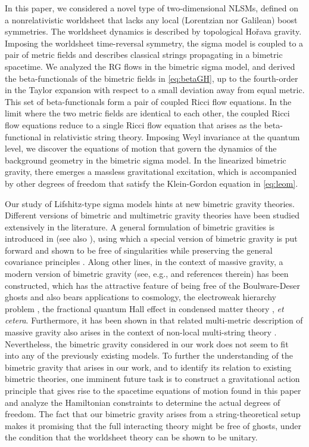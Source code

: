 \documentclass[11pt]{article}
\begin{document}
In this paper, we considered a novel type of two-dimensional NLSMs, defined on a nonrelativistic worldsheet that lacks any local (Lorentzian nor Galilean) boost symmetries. The worldsheet dynamics is described by topological Ho\v{r}ava gravity. Imposing the worldsheet time-reversal symmetry, the sigma model is coupled to a pair of metric fields and describes classical strings propagating in a bimetric spacetime. We analyzed the RG flows in the bimetric sigma model, and derived the beta-functionals of the bimetric fields in \eqref{eq:betaGH}, up to the fourth-order in the Taylor expansion with respect to a small deviation away from equal metric. This set of beta-functionals form a pair of coupled Ricci flow equations. 
In the limit where the two metric fields are identical to each other, the coupled Ricci flow equations reduce to a single Ricci flow equation that arises as the beta-functional in relativistic string theory. Imposing Weyl invariance at the quantum level, we discover the equations of motion that govern the dynamics of the background geometry in the bimetric sigma model. In the linearized bimetric gravity, there emerges a massless gravitational excitation, which is accompanied by other degrees of freedom that satisfy the Klein-Gordon equation in \eqref{eq:leom}. 

Our study of Lifshitz-type sigma models hints at new bimetric gravity theories. Different versions of bimetric and multimetric gravity theories have been studied extensively in the literature. A general formulation of bimetric gravities is introduced in \cite{Rosen:1975kk} (see also \cite{Rosen:1940zza, Rosen:1940zz}), using which a special version of bimetric gravity is put forward and shown to be free of singularities while preserving the general covariance principles \cite{Rosen:1980dp}. Along other lines, in the context of massive gravity, a modern version of bimetric gravity (see, e.g., \cite{Hassan:2011zd, Bergshoeff:2013xma} and references therein) has been constructed, which has the attractive feature of being free of the Boulware-Deser ghosts \cite{Boulware:1973my} and also bears applications to cosmology,
the electroweak hierarchy problem \cite{Avgoustidis:2020wrd}, the fractional quantum Hall effect in condensed matter theory \cite{Gromov:2017qeb}, \emph{et cetera}. Furthermore, it has been shown in \cite{Kiritsis:2008at} that related multi-metric description of massive gravity also arises in the context of non-local multi-string theory \cite{Aharony:2001pa}.
Nevertheless, the bimetric gravity considered in our work does not seem to fit into any of the previously existing models. To further the understanding of the bimetric gravity that arises in our work, and to identify its relation to existing bimetric theories, one imminent future task is to construct a gravitational action principle that gives rise to the spacetime equations of motion found in this paper and analyze the Hamiltonian constraints to determine the actual degrees of freedom. The fact that our bimetric gravity arises from a string-theoretical setup makes it promising that the full interacting theory might be free of ghosts, under the condition that the worldsheet theory can be shown to be unitary.
\end{document}
